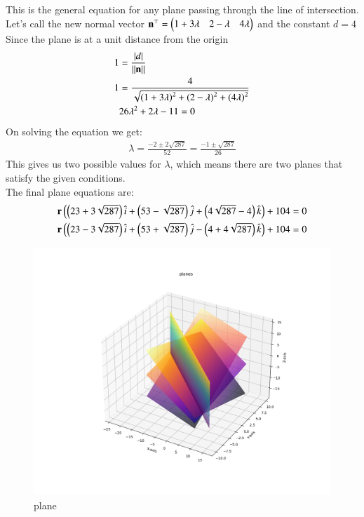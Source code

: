 \documentclass[journal]{IEEEtran}
\theoremstyle{remark}
\begin{document}
This is the general equation for any plane passing through the line of intersection. Let's call the new normal vector $\mathbf{n}^{\top}=\begin{pmatrix}1+3\lambda&2-\lambda&4\lambda\end{pmatrix}$ and the constant $d=4$\\
Since the plane is at a unit distance from the origin
\begin{align}
    1&=\frac{|d|}{\left\lVert\mathbf{n}\right\rVert}\\
    1&=\frac{4}{\sqrt{\left(1+3\lambda\right)^2+\left(2-\lambda\right)^2+\left(4\lambda\right)^2}}\\
    &26\lambda^2+2\lambda-11=0
\end{align}
On solving the equation we get:
\begin{align}
    \lambda = \frac{-2 \pm 2\sqrt{287}}{52} = \frac{-1 \pm \sqrt{287}}{26}
\end{align}
This gives us two possible values for $\lambda$, which means there are two planes that satisfy the given conditions.\\
The final plane equations are:
\begin{align}
    \mathbf{r} \left(\left(23 + 3\sqrt{287}\right)\hat{i} + \left(53 - \sqrt{287}\right)\hat{j} + \left(4\sqrt{287} - 4\right)\hat{k}\right) + 104 = 0\\
    \mathbf{r}\left(\left(23 - 3\sqrt{287}\right)\hat{i} + \left(53 + \sqrt{287}\right)\hat{j} - \left(4 + 4\sqrt{287}\right)\hat{k}\right) + 104 = 0
\end{align}


\begin{figure}[H]
    \centering
    \includegraphics[width=0.9\columnwidth]{figs/planes.png}
    \caption{plane}
    \label{fig:placeholder_1}
\end{figure}
\end{document}
